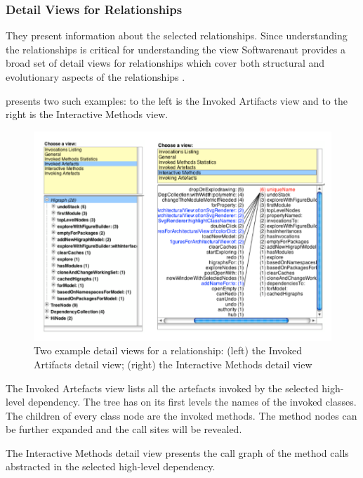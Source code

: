 \documentclass[preprint,12pt]{elsarticle}
\begin{document}
\subsubsection {Detail Views for Relationships}
They present information about the selected relationships. Since understanding the relationships is critical for understanding the view Softwarenaut provides a broad set of detail views for relationships which cover both structural and evolutionary aspects of the relationships \cite{lungu-cutedge, lungu-relevo}. 

 presents two such examples: to the left is the Invoked Artifacts view and to the right is the Interactive Methods view. 

\begin{figure}[h!]
\begin{center}
\includegraphics[width=\linewidth]{images/DetailsForEdge}
\caption{Two example detail views for a relationship: (left) the Invoked Artifacts detail view; (right) the Interactive Methods detail view}
\end{center}
\end{figure}
The Invoked Artefacts view lists all the artefacts invoked by the selected high-level dependency. The tree has on its first levels the names of the invoked classes. The children of every class node are the invoked methods. The method nodes can be further expanded and the call sites will be revealed. 

The Interactive Methods detail view presents the call graph of the method calls abstracted in the selected high-level dependency. 
\end{document}
